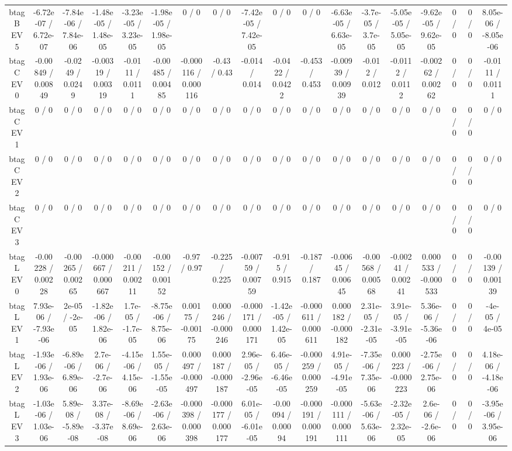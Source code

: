 \documentclass[10pt]{article}
\begin{document}
\begin{table}[htbp]
\begin{center}
\begin{tabular}{|c|c|c|c|c|c|c|c|c|c|c|c|c|c|c|c|c|c|}
  btag B EV 5 & -6.72e-07 / 6.72e-07 & -7.84e-06 / 7.84e-06 & -1.48e-05 / 1.48e-05 & -3.23e-05 / 3.23e-05 & -1.98e-05 / 1.98e-05 & 0 / 0 & 0 / 0 & -7.42e-05 / 7.42e-05 & 0 / 0 & 0 / 0 & -6.63e-05 / 6.63e-05 & -3.7e-05 / 3.7e-05 & -5.05e-05 / 5.05e-05 & -9.62e-05 / 9.62e-05 & 0 / 0 & 0 / 0 & 8.05e-06 / -8.05e-06 \\ 
  btag C EV 0 & -0.00849 / 0.00849 & -0.0249 / 0.0249 & -0.00319 / 0.00319 & -0.0111 / 0.0111 & -0.00485 / 0.00485 & -0.000116 / 0.000116 & -0.43 / 0.43 & -0.014 / 0.014 & -0.0422 / 0.0422 & -0.453 / 0.453 & -0.00939 / 0.00939 & -0.012 / 0.012 & -0.0112 / 0.0112 & -0.00262 / 0.00262 & 0 / 0 & 0 / 0 & -0.0111 / 0.0111 \\ 
  btag C EV 1 & 0 / 0 & 0 / 0 & 0 / 0 & 0 / 0 & 0 / 0 & 0 / 0 & 0 / 0 & 0 / 0 & 0 / 0 & 0 / 0 & 0 / 0 & 0 / 0 & 0 / 0 & 0 / 0 & 0 / 0 & 0 / 0 & 0 / 0 \\ 
  btag C EV 2 & 0 / 0 & 0 / 0 & 0 / 0 & 0 / 0 & 0 / 0 & 0 / 0 & 0 / 0 & 0 / 0 & 0 / 0 & 0 / 0 & 0 / 0 & 0 / 0 & 0 / 0 & 0 / 0 & 0 / 0 & 0 / 0 & 0 / 0 \\ 
  btag C EV 3 & 0 / 0 & 0 / 0 & 0 / 0 & 0 / 0 & 0 / 0 & 0 / 0 & 0 / 0 & 0 / 0 & 0 / 0 & 0 / 0 & 0 / 0 & 0 / 0 & 0 / 0 & 0 / 0 & 0 / 0 & 0 / 0 & 0 / 0 \\ 
  btag L EV 0 & -0.00228 / 0.00228 & -0.00265 / 0.00265 & -0.000667 / 0.000667 & -0.00211 / 0.00211 & -0.00152 / 0.00152 & -0.97 / 0.97 & -0.225 / 0.225 & -0.00759 / 0.00759 & -0.915 / 0.915 & -0.187 / 0.187 & -0.00645 / 0.00645 & -0.00568 / 0.00568 & -0.00241 / 0.00241 & 0.000533 / -0.000533 & 0 / 0 & 0 / 0 & -0.00139 / 0.00139 \\ 
  btag L EV 1 & 7.93e-06 / -7.93e-06 & 2e-05 / -2e-05 & -1.82e-06 / 1.82e-06 & 1.7e-05 / -1.7e-05 & -8.75e-06 / 8.75e-06 & 0.00175 / -0.00175 & 0.000246 / -0.000246 & -0.000171 / 0.000171 & -1.42e-05 / 1.42e-05 & -0.000611 / 0.000611 & 0.000182 / -0.000182 & 2.31e-05 / -2.31e-05 & 3.91e-05 / -3.91e-05 & 5.36e-06 / -5.36e-06 & 0 / 0 & 0 / 0 & -4e-05 / 4e-05 \\ 
  btag L EV 2 & -1.93e-06 / 1.93e-06 & -6.89e-06 / 6.89e-06 & 2.7e-06 / -2.7e-06 & -4.15e-06 / 4.15e-06 & 1.55e-05 / -1.55e-05 & 0.000497 / -0.000497 & 0.000187 / -0.000187 & 2.96e-05 / -2.96e-05 & 6.46e-05 / -6.46e-05 & -0.000259 / 0.000259 & 4.91e-05 / -4.91e-05 & -7.35e-06 / 7.35e-06 & 0.000223 / -0.000223 & -2.75e-06 / 2.75e-06 & 0 / 0 & 0 / 0 & 4.18e-06 / -4.18e-06 \\ 
  btag L EV 3 & -1.03e-06 / 1.03e-06 & 5.89e-08 / -5.89e-08 & 3.37e-08 / -3.37e-08 & -8.69e-06 / 8.69e-06 & -2.63e-06 / 2.63e-06 & -0.000398 / 0.000398 & -0.000177 / 0.000177 & 6.01e-05 / -6.01e-05 & -0.00094 / 0.00094 & -0.000191 / 0.000191 & -0.000111 / 0.000111 & -5.63e-06 / 5.63e-06 & -2.32e-05 / 2.32e-05 & 2.6e-06 / -2.6e-06 & 0 / 0 & 0 / 0 & -3.95e-06 / 3.95e-06 \\ 

\end{tabular}
\end{center}
\end{table}
\end{document}
